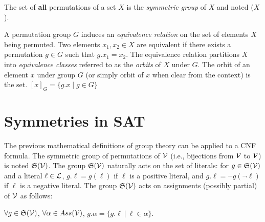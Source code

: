 \begin{definition}
The set of \textbf{all} permutations of a set $X$ is the \emph{symmetric group} of $X$ and noted \Group($X$).
\end{definition}
%

A permutation group $G$ induces an \emph{equivalence relation} on the set of elements $X$ being
permuted. Two elements $x_1, x_2 \in X$ are equivalent if there exists a permutation $g \in G$ such that
$g.x_1 = x_2$. The equivalence relation partitions $X$ into \emph{equivalence classes} referred to
as the \emph{orbits} of $X$ under $G$. The orbit of an element $x$ under group $G$ (or simply orbit of $x$ when clear
from the context) is the set. $[x]_G = \{g.x \mid g \in G\}$

\section{Symmetries in SAT}
The previous mathematical definitions of group theory can be applied to a CNF formula.
The symmetric group of permutations of $\mathcal{V}$ (i.e., bijections from $\mathcal{V}$ to $\mathcal{V}$) is noted
$\mathfrak{S}(\mathcal{V})$. The group $\mathfrak{S}(\mathcal{V})$ naturally acts on the set of literals: for $g
\in \mathfrak{S}(\mathcal{V})$ and a literal $\ell \in \mathcal{L} $, $g.\ell = g(\ell)$ if $\ell$ is a
positive literal, and $g.\ell = \neg g(\neg \ell)$ if $\ell$ is a negative literal.
The group $\mathfrak{S}(\mathcal{V})$ acts on  assignments (possibly partial) of $\mathcal{V}$ as follows: 
\begin{center}
 $\forall g \in \mathfrak{S}(\mathcal{V})$, $ \forall \alpha \in Ass(\mathcal{V})$, $g.\alpha = \{ g.\ell ~|~ \ell \in \alpha \}$.
\end{center}


